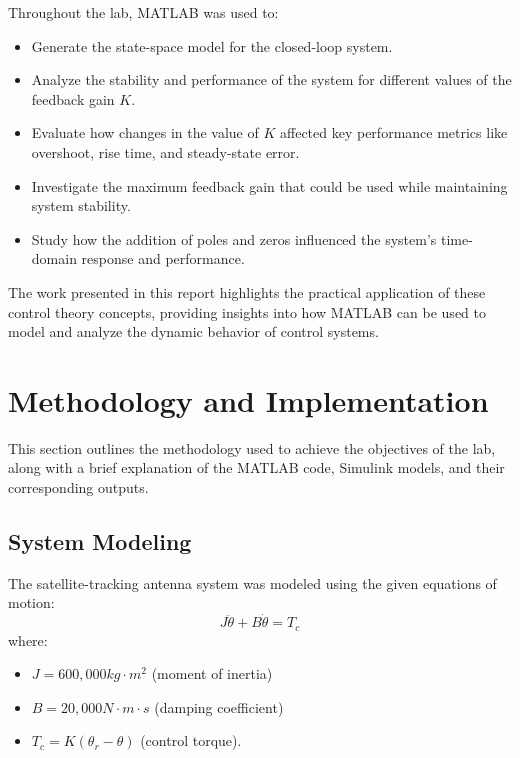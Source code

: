 \documentclass[a4paper, 12pt, english]{article}
\begin{document}
Throughout the lab, MATLAB was used to:
\begin{itemize}
    \item Generate the state-space model for the closed-loop system.
    \item Analyze the stability and performance of the system for different values of the feedback gain $K$.
    \item Evaluate how changes in the value of $K$ affected key performance metrics like overshoot, rise time, and steady-state error.
    \item Investigate the maximum feedback gain that could be used while maintaining system stability.
    \item Study how the addition of poles and zeros influenced the system’s time-domain response and performance.
\end{itemize}

The work presented in this report highlights the practical application of these control theory concepts, providing insights into how MATLAB can be used to model and analyze the dynamic behavior of control systems.

\newpage
\section{Methodology and Implementation}

This section outlines the methodology used to achieve the objectives of the lab, along with a brief explanation of the MATLAB code, Simulink models, and their corresponding outputs.

\subsection{System Modeling} \label{sec:system modeling}



\noindent
The satellite-tracking antenna system was modeled using the given equations of motion:
\[J\ddot{\theta} + B\dot{\theta} = {T}_{c} \]
where:
\begin{itemize}
    \item $J = 600,000 kg\cdot{m}^{2}$ (moment of inertia)
    \item $B = 20,000 N\cdot{m}\cdot{s}$ (damping coefficient)
    \item ${T}_{c} = K \left( {\theta}_{r} - {\theta} \right)$ (control torque).
\end{itemize}
\end{document}
